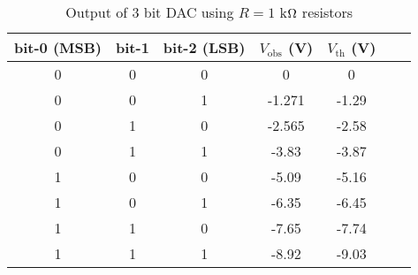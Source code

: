 \begin{table}[H]
    \centering
    \begin{tabular}{|c|c|c|c|c|c|c|}
        \hline
        bit-0 (MSB) & bit-1 & bit-2 (LSB) & $V_\text{obs}$ (V)& $ V_\text{th}$ (V) \\ \hline
0           & 0     & 0           & 0      & 0\\ \hline
0           & 0     & 1           & -1.271        & -1.29\\ \hline
0           & 1     & 0           & -2.565        & -2.58\\ \hline
0           & 1     & 1           & -3.83        & -3.87\\ \hline
1           & 0     & 0           & -5.09         & -5.16\\ \hline
1           & 0     & 1           & -6.35         & -6.45\\ \hline
1           & 1     & 0           & -7.65         & -7.74\\ \hline
1           & 1     & 1           & -8.92         & -9.03\\ \hline
    \end{tabular}
    \caption{Output of 3 bit DAC using $R=1$ k$\ohm$ resistors}
    \label{tab:1}
\end{table}